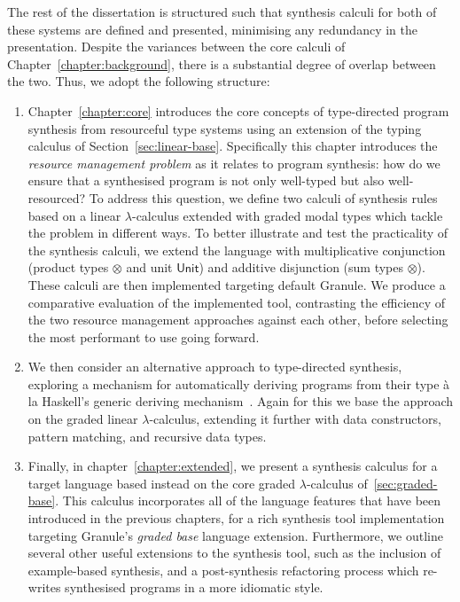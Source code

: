 The rest of the dissertation is structured such that synthesis calculi for both
of these systems are defined and presented, minimising any redundancy in the
presentation. Despite the variances between the core calculi
of Chapter~\ref{chapter:background}, there is a substantial degree of overlap between
the two. Thus, we adopt the following structure: 
\begin{enumerate}
        \item Chapter~\ref{chapter:core} introduces the core concepts of
        type-directed program synthesis from resourceful type systems using an
        extension of the typing calculus of Section~\ref{sec:linear-base}.
        Specifically this chapter introduces the \textit{resource management
        problem} as it relates to program synthesis: how do we ensure that a
        synthesised program is not only well-typed but also well-resourced? To
        address this question, we define two calculi of synthesis rules based on
        a linear $\lambda$-calculus extended with graded modal types which
        tackle the problem in different ways. To better illustrate and test the
        practicality of the synthesis calculi, we extend the language with
        multiplicative conjunction (product types $\otimes$ and unit $\mathsf{Unit}$) and
        additive disjunction (sum types $\otimes$). These calculi are then
        implemented targeting default Granule. We produce a comparative
        evaluation of the implemented tool, contrasting the efficiency
        of the two resource management approaches against each other, before
        selecting the most performant to use going forward.  

        \item We then consider an alternative approach to type-directed synthesis,
        exploring a mechanism for automatically deriving programs from their
        type à la Haskell's generic deriving mechanism~\citep{generic-deriving}.
        Again for this we base the approach on the graded linear
        $\lambda$-calculus, extending it further with data constructors, pattern
        matching, and recursive data types.
        \item Finally, in chapter~\ref{chapter:extended}, we present a synthesis
        calculus for a target language based instead on the core graded
        $\lambda$-calculus of~\ref{sec:graded-base}. This calculus incorporates
        all of the language features that have been introduced in the previous chapters,
        for a rich synthesis tool implementation targeting Granule's
        \emph{graded base} language extension. Furthermore, we outline several other useful 
        extensions to the synthesis tool, such as the inclusion of example-based synthesis,
        and a post-synthesis refactoring process which re-writes synthesised programs in 
        a more idiomatic style.


\end{enumerate}
